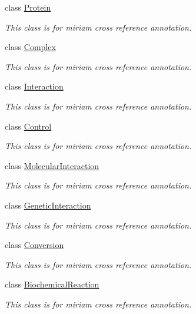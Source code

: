 \begin{DoxyCompactItemize}
class \hyperlink{classunisys_1_1Protein}{Protein}
\begin{DoxyCompactList}\small\item\em This class is for miriam cross reference annotation. \end{DoxyCompactList}\item 
class \hyperlink{classunisys_1_1Complex}{Complex}
\begin{DoxyCompactList}\small\item\em This class is for miriam cross reference annotation. \end{DoxyCompactList}\item 
class \hyperlink{classunisys_1_1Interaction}{Interaction}
\begin{DoxyCompactList}\small\item\em This class is for miriam cross reference annotation. \end{DoxyCompactList}\item 
class \hyperlink{classunisys_1_1Control}{Control}
\begin{DoxyCompactList}\small\item\em This class is for miriam cross reference annotation. \end{DoxyCompactList}\item 
class \hyperlink{classunisys_1_1MolecularInteraction}{Molecular\-Interaction}
\begin{DoxyCompactList}\small\item\em This class is for miriam cross reference annotation. \end{DoxyCompactList}\item 
class \hyperlink{classunisys_1_1GeneticInteraction}{Genetic\-Interaction}
\begin{DoxyCompactList}\small\item\em This class is for miriam cross reference annotation. \end{DoxyCompactList}\item 
class \hyperlink{classunisys_1_1Conversion}{Conversion}
\begin{DoxyCompactList}\small\item\em This class is for miriam cross reference annotation. \end{DoxyCompactList}\item 
class \hyperlink{classunisys_1_1BiochemicalReaction}{Biochemical\-Reaction}
\begin{DoxyCompactList}\small\item\em This class is for miriam cross reference annotation. \end{DoxyCompactList}\item 

\end{DoxyCompactItemize}
